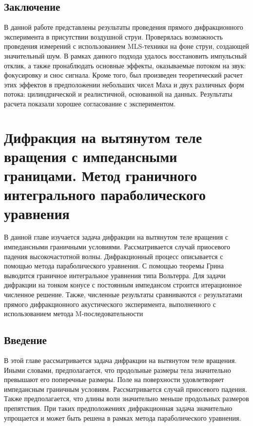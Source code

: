 \section{Заключение}
В данной работе представлены результаты проведения прямого дифракционного эксперимента в присутствии воздушной струи. Проверялась возможность проведения измерений с использованием MLS-техники на фоне струи, создающей значительный шум. В рамках данного подхода удалось восстановить импульсный отклик, а также пронаблюдать основные эффекты, оказываемые потоком на звук: фокусировку и снос сигнала. Кроме того, был произведен теоретический расчет этих эффектов в предположении небольших чисел Маха и двух различных форм потока: цилиндрической и реалистичной, основанной на данных. Результаты расчета показали хорошее согласование с экспериментом.


\chapter{Дифракция на вытянутом теле вращения с импедансными границами. Метод граничного интегрального параболического уравнения}

В данной главе изучается задача дифракции на вытянутом теле вращения с импедансными граничными условиями. Рассматривается случай приосевого падения высокочастотной волны. Дифракционный процесс описывается с помощью метода параболического уравнения. С помощью теоремы Грина выводится граничное интегральное уравнения типа Вольтерра. Для задачи дифракции на тонком конусе с постоянным импедансом строится итерационное численное решение. Также, численные результаты сравниваются c результатами прямого дифракционного акустического эксперимента, выполненного с использованием метода M-последовательности

\section{Введение}

В этой главе рассматривается задача дифракции на вытянутом теле вращения. Иными словами, предполагается, что продольные размеры тела значительно превышают его поперечные размеры. Поле на поверхности удовлетворяет импедансным граничным условиям. Рассматривается случай приосевого падения. Также предполагается, что длины волн значительно меньше продольных размеров препятствия. При таких предположениях дифракционная задача значительно упрощается и может быть решена в рамках метода параболического уравнения.

